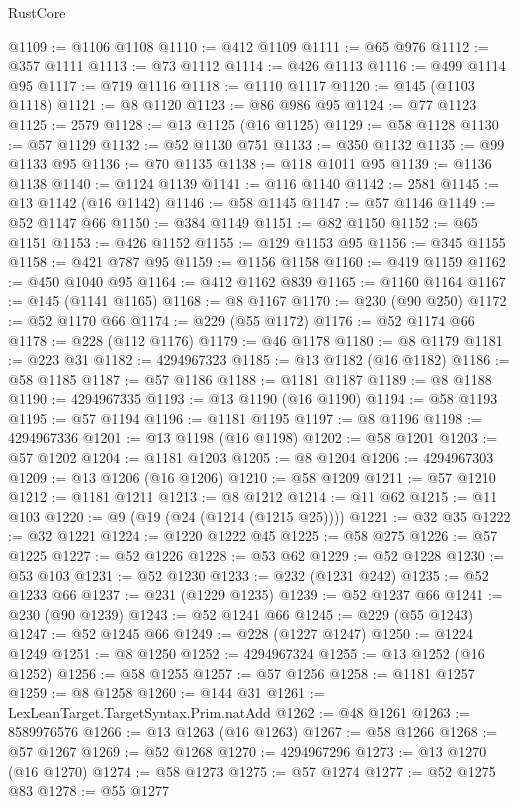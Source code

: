 \begin{lexlean}{RustCore}
\begin{coremodule}
@1109 := @1106 @1108
@1110 := @412 @1109
@1111 := @65 @976
@1112 := @357 @1111
@1113 := @73 @1112
@1114 := @426 @1113
@1116 := @499 @1114 @95
@1117 := @719 @1116
@1118 := @1110 @1117
@1120 := @145 (@1103 @1118)
@1121 := @8 @1120
@1123 := @86 @986 @95
@1124 := @77 @1123
@1125 := 2579
@1128 := @13 @1125 (@16 @1125)
@1129 := @58 @1128
@1130 := @57 @1129
@1132 := @52 @1130 @751
@1133 := @350 @1132
@1135 := @99 @1133 @95
@1136 := @70 @1135
@1138 := @118 @1011 @95
@1139 := @1136 @1138
@1140 := @1124 @1139
@1141 := @116 @1140
@1142 := 2581
@1145 := @13 @1142 (@16 @1142)
@1146 := @58 @1145
@1147 := @57 @1146
@1149 := @52 @1147 @66
@1150 := @384 @1149
@1151 := @82 @1150
@1152 := @65 @1151
@1153 := @426 @1152
@1155 := @129 @1153 @95
@1156 := @345 @1155
@1158 := @421 @787 @95
@1159 := @1156 @1158
@1160 := @419 @1159
@1162 := @450 @1040 @95
@1164 := @412 @1162 @839
@1165 := @1160 @1164
@1167 := @145 (@1141 @1165)
@1168 := @8 @1167
@1170 := @230 (@90 @250)
@1172 := @52 @1170 @66
@1174 := @229 (@55 @1172)
@1176 := @52 @1174 @66
@1178 := @228 (@112 @1176)
@1179 := @46 @1178
@1180 := @8 @1179
@1181 := @223 @31
@1182 := 4294967323
@1185 := @13 @1182 (@16 @1182)
@1186 := @58 @1185
@1187 := @57 @1186
@1188 := @1181 @1187
@1189 := @8 @1188
@1190 := 4294967335
@1193 := @13 @1190 (@16 @1190)
@1194 := @58 @1193
@1195 := @57 @1194
@1196 := @1181 @1195
@1197 := @8 @1196
@1198 := 4294967336
@1201 := @13 @1198 (@16 @1198)
@1202 := @58 @1201
@1203 := @57 @1202
@1204 := @1181 @1203
@1205 := @8 @1204
@1206 := 4294967303
@1209 := @13 @1206 (@16 @1206)
@1210 := @58 @1209
@1211 := @57 @1210
@1212 := @1181 @1211
@1213 := @8 @1212
@1214 := @11 @62
@1215 := @11 @103
@1220 := @9 (@19 (@24 (@1214 (@1215 @25))))
@1221 := @32 @35
@1222 := @32 @1221
@1224 := @1220 @1222 @45
@1225 := @58 @275
@1226 := @57 @1225
@1227 := @52 @1226
@1228 := @53 @62
@1229 := @52 @1228
@1230 := @53 @103
@1231 := @52 @1230
@1233 := @232 (@1231 @242)
@1235 := @52 @1233 @66
@1237 := @231 (@1229 @1235)
@1239 := @52 @1237 @66
@1241 := @230 (@90 @1239)
@1243 := @52 @1241 @66
@1245 := @229 (@55 @1243)
@1247 := @52 @1245 @66
@1249 := @228 (@1227 @1247)
@1250 := @1224 @1249
@1251 := @8 @1250
@1252 := 4294967324
@1255 := @13 @1252 (@16 @1252)
@1256 := @58 @1255
@1257 := @57 @1256
@1258 := @1181 @1257
@1259 := @8 @1258
@1260 := @144 @31
@1261 := LexLeanTarget.TargetSyntax.Prim.natAdd
@1262 := @48 @1261
@1263 := 8589976576
@1266 := @13 @1263 (@16 @1263)
@1267 := @58 @1266
@1268 := @57 @1267
@1269 := @52 @1268
@1270 := 4294967296
@1273 := @13 @1270 (@16 @1270)
@1274 := @58 @1273
@1275 := @57 @1274
@1277 := @52 @1275 @83
@1278 := @55 @1277

\end{coremodule}
\end{lexlean}
